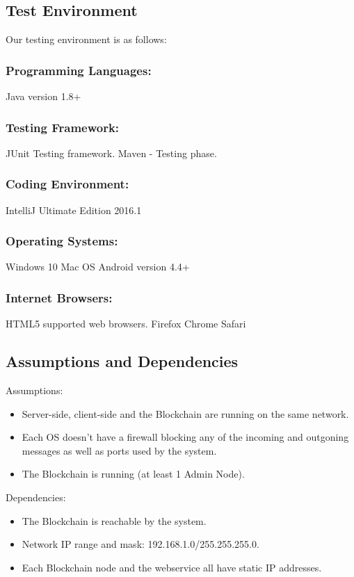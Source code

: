 \documentclass[11pt]{article}
\begin{document}
	\subsection{Test Environment}
	Our testing environment is as follows:
	\subsubsection{Programming Languages:}
	Java version 1.8+
	\subsubsection{Testing Framework:}
	JUnit Testing framework.\newline
	Maven - Testing phase.
	\subsubsection{Coding Environment:}
	IntelliJ Ultimate Edition 2016.1
	\subsubsection{Operating Systems:}
	Windows 10\newline
	Mac OS\newline
	Android version 4.4+
	\subsubsection{Internet Browsers:}
	HTML5 supported web browsers.\newline
	Firefox\newline
	Chrome\newline
	Safari
	\subsection{Assumptions and Dependencies}
	Assumptions:
	\begin{itemize}
		\item Server-side, client-side and the Blockchain are running on the same network.
		\item Each OS doesn't have a firewall blocking any of the incoming and outgoning messages as well as ports used by the system.
		\item The Blockchain is running (at least 1 Admin Node).
	\end{itemize}
	Dependencies:
	\begin{itemize}
		\item The Blockchain is reachable by the system.
		\item Network IP range and mask: 192.168.1.0/255.255.255.0.
		\item Each Blockchain node and the webservice all have static IP addresses.
	\end{itemize}
	\newpage	
	
\end{document}
